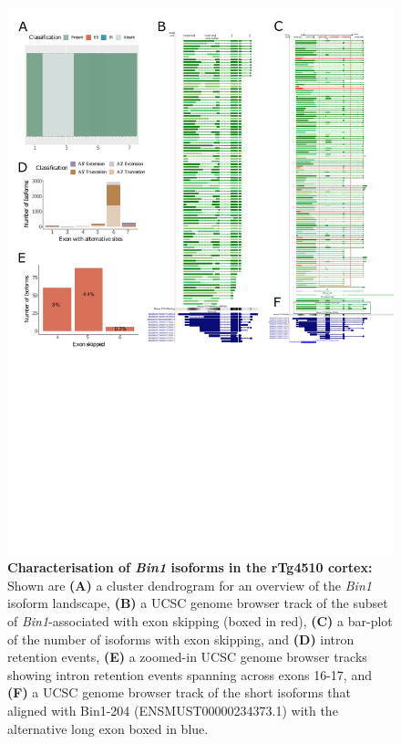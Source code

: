 \begin{figure}[htp]
	\centering
	\includegraphics[page=3,trim={0 1cm 0 0},scale = 0.85]{Figures/TargetGenes_Annotation_Portrait.pdf}
	\captionsetup{width=0.95\textwidth}
	\caption[Characterisation of \textit{Bin1} isoforms in the rTg4510 cortex]%
	{\textbf{Characterisation of \textit{Bin1} isoforms in the rTg4510 cortex:} Shown are \textbf{(A)} a cluster dendrogram for an overview of the \textit{Bin1} isoform landscape, \textbf{(B)} a UCSC genome browser track of the subset of \textit{Bin1}-associated with exon skipping (boxed in red), \textbf{(C)} a bar-plot of the number of isoforms with exon skipping, and \textbf{(D)} intron retention events, \textbf{(E)} a zoomed-in UCSC genome browser tracks showing intron retention events spanning across exons 16-17, and \textbf{(F)} a UCSC genome browser track of the short isoforms that aligned with Bin1-204 (ENSMUST00000234373.1) with the alternative long exon boxed in blue.}    
	\label{fig:bin1}
\end{figure}
\restoregeometry

